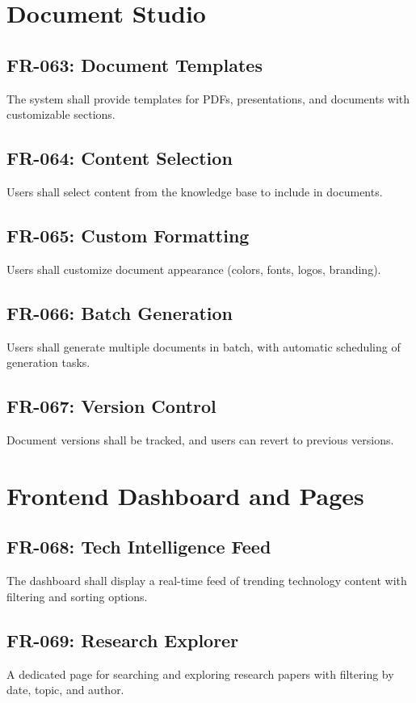 \documentclass{report}
\begin{document}
\section{Document Studio}

\subsection{FR-063: Document Templates}
The system shall provide templates for PDFs, presentations, and documents with customizable sections.

\subsection{FR-064: Content Selection}
Users shall select content from the knowledge base to include in documents.

\subsection{FR-065: Custom Formatting}
Users shall customize document appearance (colors, fonts, logos, branding).

\subsection{FR-066: Batch Generation}
Users shall generate multiple documents in batch, with automatic scheduling of generation tasks.

\subsection{FR-067: Version Control}
Document versions shall be tracked, and users can revert to previous versions.

\section{Frontend Dashboard and Pages}

\subsection{FR-068: Tech Intelligence Feed}
The dashboard shall display a real-time feed of trending technology content with filtering and sorting options.

\subsection{FR-069: Research Explorer}
A dedicated page for searching and exploring research papers with filtering by date, topic, and author.
\end{document}
